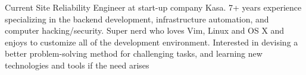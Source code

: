 

\begin{cvparagraph}

Current Site Reliability Engineer at start-up company Kasa. 7+ years experience specializing in the backend development, infrastructure automation, and computer hacking/security. Super nerd who loves Vim, Linux and OS X and enjoys to customize all of the development environment. Interested in devising a better problem-solving method for challenging tasks, and learning new technologies and tools if the need arises
\end{cvparagraph}
